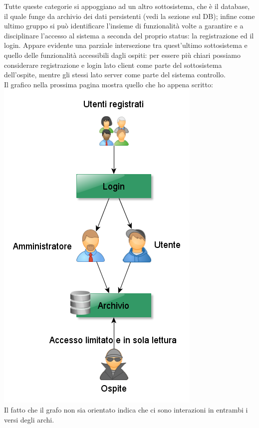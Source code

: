 \noindent
Tutte queste categorie si appoggiano ad un altro sottosistema, che è il database, il quale funge da archivio dei dati persistenti (vedi la sezione sul DB); infine come ultimo gruppo
si può identificare l'insieme di funzionalità volte a garantire e a disciplinare l'accesso al sistema a seconda del proprio status: la registrazione ed il login. Appare evidente una
parziale intersezione tra quest'ultimo sottosistema e quello delle funzionalità accessibili dagli ospiti: per essere più chiari possiamo considerare registrazione e login lato client
come parte del sottosistema dell'ospite, mentre gli stessi lato server come parte del sistema controllo.
\\
Il grafico nella prossima pagina mostra quello che ho appena scritto:
\pagebreak
\center
\includegraphics[scale=0.6]{sottosistemi.png}
\\
\noindent
\justifying
Il fatto che il grafo non sia orientato indica che ci sono interazioni in entrambi i versi degli archi.
